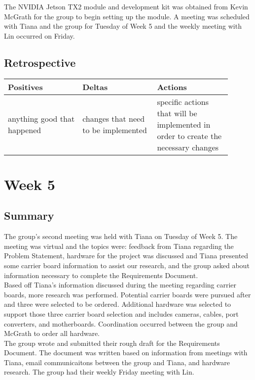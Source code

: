 \documentclass[letterpaper,10pt,serif,draftclsnofoot,onecolumn,compsoc,titlepage]{IEEEtran}
\begin{document}
The NVIDIA Jetson TX2 module and development kit was obtained from Kevin McGrath for 
the group to begin setting up the module.
A meeting was scheduled with Tiana and the group for Tuesday of Week 5 and the weekly 
meeting with Lin occurred on Friday.\\

\subsection{Retrospective}

\begin{tabular}{|p{0.3\linewidth}|p{0.3\linewidth}|p{0.3\linewidth}|}
   \hline
   \textbf{Positives} & \textbf{Deltas} & \textbf{Actions}\\ 
   \hline
   anything good that happened 
   & 
   changes that need to be implemented 
   & 
   specific actions that will be implemented in order to create the necessary 
   changes \\
   \hline
\end{tabular}

\section{Week 5}

\subsection{Summary}

The group's second meeting was held with Tiana on Tuesday of Week 5. The meeting was 
virtual and the topics were: feedback from Tiana regarding the Problem Statement, 
hardware for the project was discussed and Tiana presented some carrier board information 
to assist our research, and the group asked about information necessary to complete 
the Requirements Document. \\

Based off Tiana's information discussed during the meeting regarding carrier boards,
more research was performed. Potential carrier boards were pursued after and three 
were selected to be ordered. Additional hardware was selected to support those three 
carrier board selection and includes cameras, cables, port converters, and 
motherboards. Coordination occurred between the group and McGrath to order all 
hardware. \\

The group wrote and submitted their rough draft for the Requirements Document. The 
document was written based on information from meetings with Tiana, email 
communicaitons between the group and Tiana, and hardware research.  The group had 
their weekly Friday meeting with Lin. \\
\end{document}

